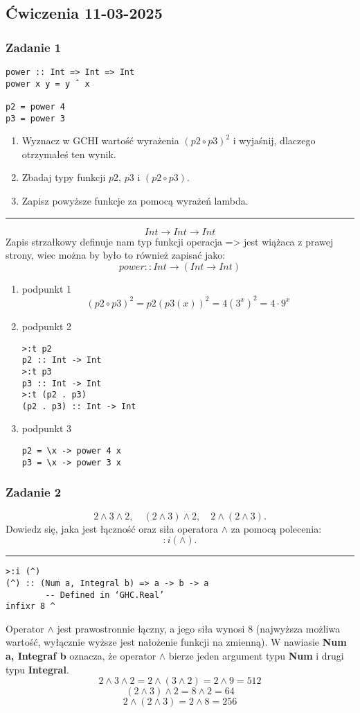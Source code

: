\documentclass[11pt,a4paper]{article}
\begin{document}
\subsection{Ćwiczenia 11-03-2025}
\subsubsection{Zadanie 1}
\begin{Verbatim}[frame=single]
power :: Int => Int => Int
power x y = y ˆ x

p2 = power 4
p3 = power 3
\end{Verbatim}
\begin{enumerate}
    \item Wyznacz w GCHI wartość wyrażenia \( (p2 \circ p3)^2 \) i wyjaśnij, dlaczego otrzymałeś ten wynik.
    \item Zbadaj typy funkcji \( p2 \), \( p3 \) i \( (p2 \circ p3) \).
    \item Zapisz powyższe funkcje za pomocą wyrażeń lambda.
\end{enumerate}
\bigskip
\hrule
\bigskip
\[
    Int \rightarrow Int \rightarrow Int
\]
Zapis strzałkowy definuje nam typ funkcji operacja => jest wiążaca z prawej strony, wiec można by było to również zapisać jako:
\[
    power::Int \rightarrow (Int \rightarrow Int)
\]
\begin{enumerate}
    \item podpunkt 1
\[
    (p2 \circ p3)^2 = p2(p3(x))^2 = 4(3^x)^2 = 4 \cdot 9^x
\]
\item podpunkt 2
    \begin{Verbatim}[frame=single]
>:t p2
p2 :: Int -> Int
>:t p3
p3 :: Int -> Int
>:t (p2 . p3)
(p2 . p3) :: Int -> Int
    \end{Verbatim}
\item podpunkt 3
    \begin{Verbatim}[frame=single]
p2 = \x -> power 4 x
p3 = \x -> power 3 x
    \end{Verbatim}
\end{enumerate}
\subsubsection{Zadanie 2}
\[
2 \wedge 3 \wedge 2, \quad (2 \wedge 3) \wedge 2, \quad 2 \wedge (2 \wedge 3).
\]
Dowiedz się, jaka jest łączność oraz siła operatora \(\wedge\) za pomocą polecenia:
\[
:i (\wedge).
\]
\bigskip
\hrule
\bigskip
\begin{Verbatim}[frame=single]
>:i (^)
(^) :: (Num a, Integral b) => a -> b -> a
        -- Defined in ‘GHC.Real’
infixr 8 ^
\end{Verbatim}
Operator \(\wedge\) jest prawostronnie łączny, a jego siła wynosi 8 (najwyższa możliwa wartość, wyłącznie wyższe jest nałożenie funkcji na zmienną). W nawiasie \textbf{Num a, Integraf b} oznacza, że operator \(\wedge\) bierze jeden argument typu \textbf{Num} i drugi typu \textbf{Integral}.
\[
    2 \wedge 3 \wedge 2 = 2 \wedge (3 \wedge 2) = 2 \wedge 9 = 512
\]
\[
    (2 \wedge 3) \wedge 2 = 8 \wedge 2 = 64
\]
\[
    2 \wedge (2 \wedge 3) = 2 \wedge 8 = 256
\]
\end{document}

